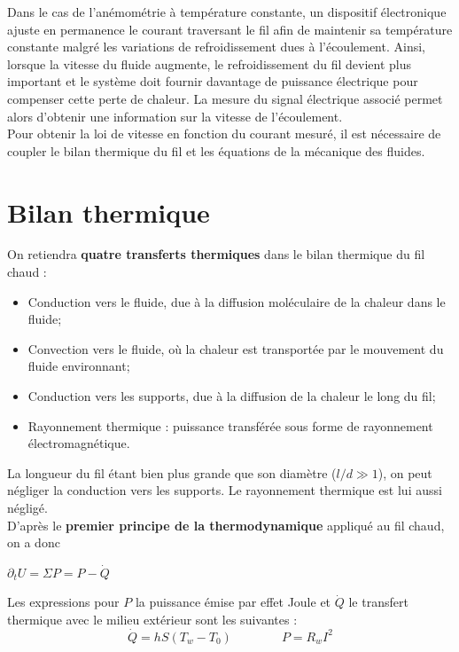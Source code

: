 \documentclass[12pt, a4paper]{report}
\begin{document}
	Dans le cas de l'anémométrie à température constante, un dispositif électronique ajuste en permanence le courant traversant le fil afin de maintenir sa température constante malgré les variations de refroidissement dues à l'écoulement. Ainsi, lorsque la vitesse du fluide augmente, le refroidissement du fil devient plus important et le système doit fournir davantage de puissance électrique pour compenser cette perte de chaleur. La mesure du signal électrique associé permet alors d'obtenir une information sur la vitesse de l'écoulement.\\
	
	Pour obtenir la loi de vitesse en fonction du courant mesuré, il est nécessaire de coupler le bilan thermique du fil et les équations de la mécanique des fluides.
	
	\section{Bilan thermique}
	On retiendra \textbf{quatre transferts thermiques} dans le bilan thermique du fil chaud :
	\vspace{1mm}
	\begin{itemize}
		\item Conduction vers le fluide, due à la diffusion moléculaire de la chaleur dans le fluide;
		\item Convection vers le fluide, où la chaleur est transportée par le mouvement du fluide	environnant;
		\item Conduction vers les supports, due à la diffusion de la chaleur le long du fil;
		\item Rayonnement thermique : puissance transférée sous forme de rayonnement électromagnétique.
	\end{itemize}
	\vspace{3mm}
	
	\noindent La longueur du fil étant bien plus grande que son diamètre ($l/d \gg 1$), on peut négliger la conduction vers les supports. Le rayonnement thermique est lui aussi négligé.\\
	
	\noindent D'après le \textbf{premier principe de la thermodynamique} appliqué au fil chaud, on a donc
	\begin{center}
		$\partial_t U = \Sigma P = P - \dot{Q} $
	\end{center}
	
	\noindent Les expressions pour $P$ la puissance émise par effet Joule et $\dot{Q}$ le transfert thermique avec le milieu extérieur sont les suivantes :
	\vspace{1mm}
	\begin{equation*}
		\dot{Q} =  h S (T_w - T_0) \qquad \qquad P = R_{w} I^2
	\end{equation*}
	
\end{document}

